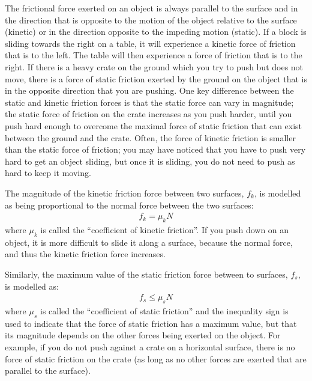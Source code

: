 The frictional force exerted on an object is always parallel to the surface and in the direction that is opposite to the motion of the object relative to the surface (kinetic) or in the direction opposite to the impeding motion (static). If a block is sliding towards the right on a table, it will experience a kinetic force of friction that is to the left. The table will then experience a force of friction that is to the right. If there is a heavy crate on the ground which you try to push but does not move, there is a force of static friction exerted by the ground on the object that is in the opposite direction that you are pushing. One key difference between the static and kinetic friction forces is that the static force can vary in magnitude; the static force of friction on the crate increases as you push harder, until you push hard enough to overcome the maximal force of static friction that can exist between the ground and the crate. Often, the force of kinetic friction is smaller than the static force of friction; you may have noticed that you have to push very hard to get an object sliding, but once it is sliding, you do not need to push as hard to keep it moving.

The magnitude of the kinetic friction force between two surfaces, $f_k$, is modelled as being proportional to the normal force between the two surfaces:
\begin{align*}
f_k=\mu_kN
\end{align*}
where $\mu_k$ is called the ``coefficient of kinetic friction''. If you push down on an object, it is more difficult to slide it along a surface, because the normal force, and thus the kinetic friction force increases.

Similarly, the maximum value of the static friction force between to surfaces, $f_s$, is modelled as:
\begin{align*}
f_s\leq\mu_sN
\end{align*}
where $\mu_s$ is called the ``coefficient of static friction'' and the inequality sign is used to indicate that the force of static friction has a maximum value, but that its magnitude depends on the other forces being exerted on the object. For example, if you do not push against a crate on a horizontal surface, there is no force of static friction on the crate (as long as no other forces are exerted that are parallel to the surface).

